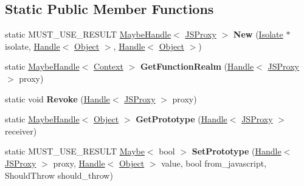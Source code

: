 \subsection*{Static Public Member Functions}
\begin{DoxyCompactItemize}
\item 
static M\+U\+S\+T\+\_\+\+U\+S\+E\+\_\+\+R\+E\+S\+U\+LT \hyperlink{classv8_1_1internal_1_1_maybe_handle}{Maybe\+Handle}$<$ \hyperlink{classv8_1_1internal_1_1_j_s_proxy}{J\+S\+Proxy} $>$ {\bfseries New} (\hyperlink{classv8_1_1internal_1_1_isolate}{Isolate} $\ast$isolate, \hyperlink{classv8_1_1internal_1_1_handle}{Handle}$<$ \hyperlink{classv8_1_1internal_1_1_object}{Object} $>$, \hyperlink{classv8_1_1internal_1_1_handle}{Handle}$<$ \hyperlink{classv8_1_1internal_1_1_object}{Object} $>$)\hypertarget{classv8_1_1internal_1_1_j_s_proxy_ac70b136605f3c2cd716aae1423f07bb7}{}\label{classv8_1_1internal_1_1_j_s_proxy_ac70b136605f3c2cd716aae1423f07bb7}

\item 
static \hyperlink{classv8_1_1internal_1_1_maybe_handle}{Maybe\+Handle}$<$ \hyperlink{classv8_1_1internal_1_1_context}{Context} $>$ {\bfseries Get\+Function\+Realm} (\hyperlink{classv8_1_1internal_1_1_handle}{Handle}$<$ \hyperlink{classv8_1_1internal_1_1_j_s_proxy}{J\+S\+Proxy} $>$ proxy)\hypertarget{classv8_1_1internal_1_1_j_s_proxy_ab84352a0ad60c6d2c0b975d7dc2fffab}{}\label{classv8_1_1internal_1_1_j_s_proxy_ab84352a0ad60c6d2c0b975d7dc2fffab}

\item 
static void {\bfseries Revoke} (\hyperlink{classv8_1_1internal_1_1_handle}{Handle}$<$ \hyperlink{classv8_1_1internal_1_1_j_s_proxy}{J\+S\+Proxy} $>$ proxy)\hypertarget{classv8_1_1internal_1_1_j_s_proxy_ab9812cf07dabee2a0f3aa34deb8bec25}{}\label{classv8_1_1internal_1_1_j_s_proxy_ab9812cf07dabee2a0f3aa34deb8bec25}

\item 
static \hyperlink{classv8_1_1internal_1_1_maybe_handle}{Maybe\+Handle}$<$ \hyperlink{classv8_1_1internal_1_1_object}{Object} $>$ {\bfseries Get\+Prototype} (\hyperlink{classv8_1_1internal_1_1_handle}{Handle}$<$ \hyperlink{classv8_1_1internal_1_1_j_s_proxy}{J\+S\+Proxy} $>$ receiver)\hypertarget{classv8_1_1internal_1_1_j_s_proxy_a7db144a6742ed2b066f0d884297a7011}{}\label{classv8_1_1internal_1_1_j_s_proxy_a7db144a6742ed2b066f0d884297a7011}

\item 
static M\+U\+S\+T\+\_\+\+U\+S\+E\+\_\+\+R\+E\+S\+U\+LT \hyperlink{classv8_1_1_maybe}{Maybe}$<$ bool $>$ {\bfseries Set\+Prototype} (\hyperlink{classv8_1_1internal_1_1_handle}{Handle}$<$ \hyperlink{classv8_1_1internal_1_1_j_s_proxy}{J\+S\+Proxy} $>$ proxy, \hyperlink{classv8_1_1internal_1_1_handle}{Handle}$<$ \hyperlink{classv8_1_1internal_1_1_object}{Object} $>$ value, bool from\+\_\+javascript, Should\+Throw should\+\_\+throw)\hypertarget{classv8_1_1internal_1_1_j_s_proxy_af1db27185777188d52476cc6a6bdd17f}{}\label{classv8_1_1internal_1_1_j_s_proxy_af1db27185777188d52476cc6a6bdd17f}


\end{DoxyCompactItemize}
